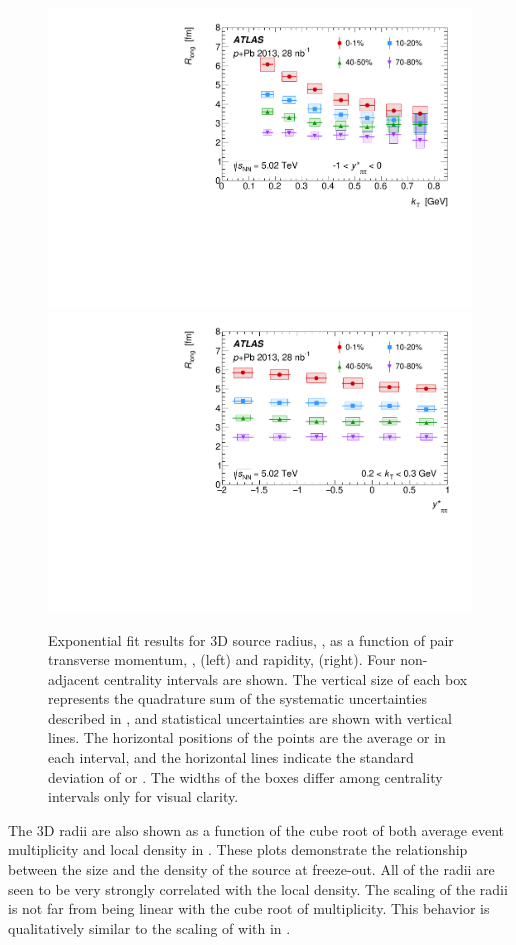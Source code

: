 \begin{figure}[ht]
\centering
\includegraphics[width=.49\linewidth]{canqosl_Rlong_vs_kt.pdf}
\includegraphics[width=.49\linewidth]{canqosl_Rlong_vs_kys.pdf}
\caption{Exponential fit results for 3D source radius, \Rlong, as a function of pair transverse momentum, \kt, (left) and rapidity, \kys (right). Four non-adjacent centrality intervals are shown. The vertical size of each box represents the quadrature sum of the systematic uncertainties described in , and statistical uncertainties are shown with vertical lines. The horizontal positions of the points are the average \kt or \kys in each interval, and the horizontal lines indicate the standard deviation of \kt or \kys. The widths of the boxes differ among centrality intervals only for visual clarity.}
\label{fig:results_Rlong}
\end{figure}

The 3D radii are also shown as a function of the cube root of both average event multiplicity and local density
in .
These plots demonstrate the relationship between the size and the density of the source at freeze-out.
All of the radii are seen to be very strongly correlated with the local density.
The scaling of the radii is not far from being linear with the cube root of multiplicity.
This behavior is qualitatively similar to the scaling of \Rinv with \avgdNdeta in .


